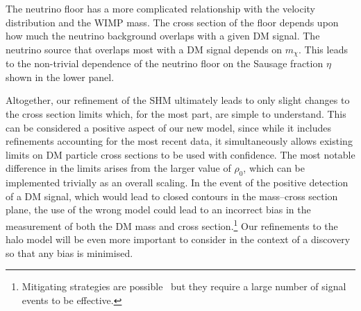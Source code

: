 \documentclass[prd,10pt,twocolumn,showpacs,nofootinbib, aps,superscriptaddress,preprintnumbers]{revtex4-1}
\begin{document}
The neutrino floor has a more complicated relationship with the
velocity distribution and the WIMP mass. The cross section of the
floor depends upon how much the neutrino background overlaps with a
given DM signal. The neutrino source that overlaps most with a DM
signal depends on $m_\chi$.  This leads to the non-trivial dependence
of the neutrino floor on the Sausage fraction $\eta$ shown in the
lower panel.

Altogether, our refinement of the SHM ultimately leads to only slight
changes to the cross section limits which, for the most part, are
simple to understand.  This can be considered a positive aspect of our
new model, since while it includes refinements accounting for the most
recent data, it simultaneously allows existing limits on DM particle
cross sections to be used with confidence.  The most notable
difference in the limits arises from the larger value of $\rho_0$,
which can be implemented trivially as an overall scaling.  In the
event of the positive detection of a DM signal, which would lead to
closed contours in the mass--cross section plane, the use of the wrong
model could lead to an incorrect bias in the measurement of both the
DM mass and cross section.\footnote{Mitigating strategies are
  possible~\cite{Peter:2011eu,Kavanagh:2013wba,Kavanagh:2016xfi} but
  they require a large number of signal events to be effective.}  Our
refinements to the halo model will be even more important to consider
in the context of a discovery so that any bias is minimised.
\end{document}
